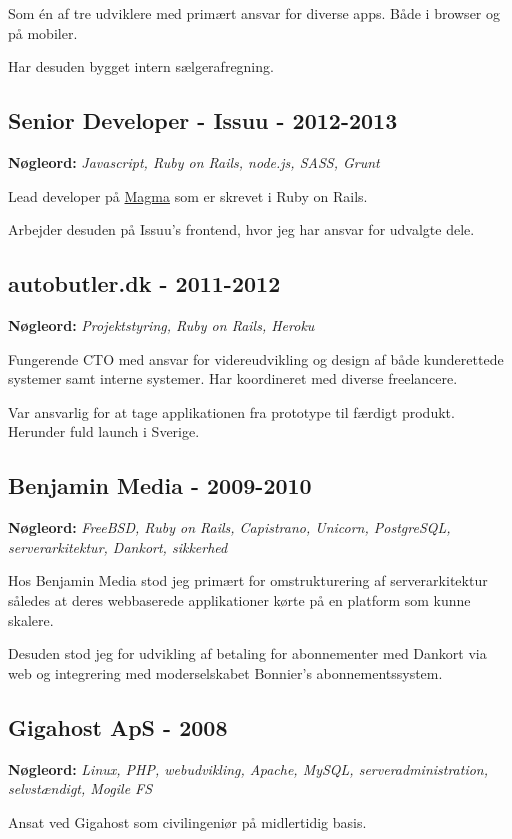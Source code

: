 \documentclass[a4paper]{article}
\newcommand{\keywords}[1]{\small\textbf{Nøgleord:} \emph{#1}\normalsize}
\begin{document}
Som én af tre udviklere med primært ansvar for diverse apps. Både i browser og på mobiler.

Har desuden bygget intern sælgerafregning.

\subsection*{Senior Developer - Issuu - 2012-2013}
\keywords{Javascript, Ruby on Rails, node.js, SASS, Grunt}

Lead developer på \href{http://www.magmahq.com}{Magma} som er skrevet i Ruby on Rails.

Arbejder desuden på Issuu's frontend, hvor jeg har ansvar for udvalgte dele.

\subsection*{autobutler.dk - 2011-2012}
\keywords{Projektstyring, Ruby on Rails, Heroku}

Fungerende CTO med ansvar for videreudvikling og design af både kunderettede systemer samt interne systemer. Har koordineret med diverse freelancere.

Var ansvarlig for at tage applikationen fra prototype til færdigt produkt. Herunder fuld launch i Sverige. 

\subsection*{Benjamin Media - 2009-2010}

\keywords{FreeBSD, Ruby on Rails, Capistrano, Unicorn, PostgreSQL, serverarkitektur, Dankort, sikkerhed}

Hos Benjamin Media stod jeg primært for omstrukturering af serverarkitektur således at deres webbaserede applikationer kørte på en platform som kunne skalere.

Desuden stod jeg for udvikling af betaling for abonnementer med Dankort via web og integrering med moderselskabet Bonnier's abonnementssystem.

\subsection*{Gigahost ApS - 2008}

\keywords{Linux, PHP, webudvikling, Apache, MySQL, serveradministration, selvstændigt, Mogile FS}

Ansat ved Gigahost som civilingeniør på midlertidig basis.
\end{document}
